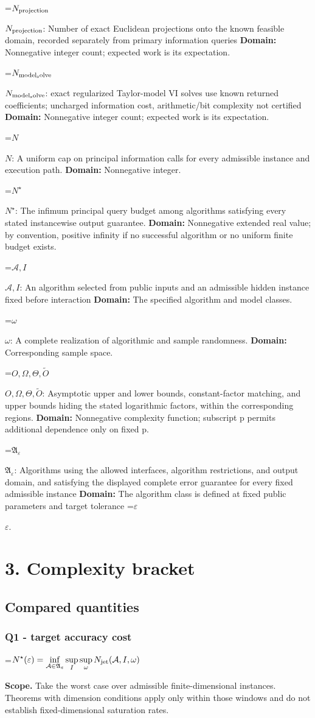 \documentclass[10pt,a4paper]{article}
\newcommand{\AtlasMath}[1]{\par\begingroup\centering\setbox0=\hbox{$\displaystyle #1$}\ifdim\wd0>1.4\linewidth\typeout{ATLAS WIDE FORMULA: \the\wd0}\fi\ifdim\wd0>\linewidth\resizebox{\linewidth}{!}{\box0}\else\box0\fi\par\endgroup}
\newcommand{\AtlasInlineMath}[1]{\begingroup\setbox0=\hbox{$#1$}\ifdim\wd0>.4\linewidth\endgroup\AtlasMath{#1}\else\endgroup$#1$\fi}
\begin{document}
\AtlasInlineMath{N_{\rm projection}}: Number of exact Euclidean projections onto the known feasible domain, recorded separately from primary information queries \textbf{Domain:} Nonnegative integer count; expected work is its expectation.

\AtlasInlineMath{N_{\rm model_solve}}: exact regularized Taylor-model VI solves use known returned coefficients; uncharged information cost, arithmetic/bit complexity not certified \textbf{Domain:} Nonnegative integer count; expected work is its expectation.

\AtlasInlineMath{N}: A uniform cap on principal information calls for every admissible instance and execution path. \textbf{Domain:} Nonnegative integer.

\AtlasInlineMath{N^\star}: The infimum principal query budget among algorithms satisfying every stated instancewise output guarantee. \textbf{Domain:} Nonnegative extended real value; by convention, positive infinity if no successful algorithm or no uniform finite budget exists.

\AtlasInlineMath{\mathcal A,I}: An algorithm selected from public inputs and an admissible hidden instance fixed before interaction \textbf{Domain:} The specified algorithm and model classes.

\AtlasInlineMath{\omega}: A complete realization of algorithmic and sample randomness. \textbf{Domain:} Corresponding sample space.

\AtlasInlineMath{O,\Omega,\Theta,\widetilde O}: Asymptotic upper and lower bounds, constant-factor matching, and upper bounds hiding the stated logarithmic factors, within the corresponding regions. \textbf{Domain:} Nonnegative complexity function; subscript p permits additional dependence only on fixed p.

\AtlasInlineMath{\mathfrak A_\varepsilon}: Algorithms using the allowed interfaces, algorithm restrictions, and output domain, and satisfying the displayed complete error guarantee for every fixed admissible instance \textbf{Domain:} The algorithm class is defined at fixed public parameters and target tolerance \AtlasInlineMath{\varepsilon}.

\section{3. Complexity bracket}
\subsection{Compared quantities}
\subsubsection{Q1 - target accuracy cost}
\AtlasMath{N^\star(\varepsilon)=\inf_{\mathcal A\in\mathfrak A_\varepsilon}\sup_I \sup_\omega N_{\rm jet}(\mathcal A,I,\omega)}
\textbf{Scope.} Take the worst case over admissible finite-dimensional instances. Theorems with dimension conditions apply only within those windows and do not establish fixed-dimensional saturation rates.
\end{document}
